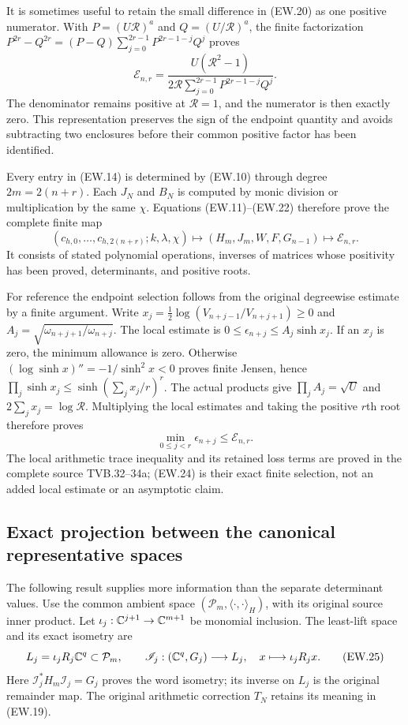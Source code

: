 It is sometimes useful to retain the small difference in (EW.20)
as one positive numerator. With
$P=(U\mathscr R)^a$ and $Q=(U/\mathscr R)^a$, the finite
factorization $P^{2r}-Q^{2r}=(P-Q)\sum_{j=0}^{2r-1}P^{2r-1-j}Q^j$
proves
\[
 \boxed{\mathcal E_{n,r}=
 \frac{U(\mathscr R^2-1)}
 {2\mathscr R\displaystyle\sum_{j=0}^{2r-1}P^{2r-1-j}Q^j}.}
                                                               \tag{EW.22}
\]
The denominator remains positive at $\mathscr R=1$, and the
numerator is then exactly zero. This representation preserves the
sign of the endpoint quantity and avoids subtracting two enclosures
before their common positive factor has been identified.

Every entry in (EW.14) is determined by (EW.10) through degree
$2m=2(n+r)$. Each $J_N$ and $B_N$ is computed by monic division
or multiplication by the same $\chi$. Equations (EW.11)--(EW.22)
therefore prove the complete finite map
\[
 \boxed{(c_{h,0},\ldots,c_{h,2(n+r)};k,\lambda,\chi)
    \longmapsto(H_m,J_m,W,F,G_{n-1})
    \longmapsto\mathcal E_{n,r}.}                            \tag{EW.23}
\]
It consists of stated polynomial operations, inverses of matrices
whose positivity has been proved, determinants, and positive roots.

For reference the endpoint selection follows from the original
degreewise estimate by a finite argument. Write
$x_j=\tfrac12\log(V_{n+j-1}/V_{n+j+1})\ge0$ and
$A_j=\sqrt{\omega_{n+j+1}/\omega_{n+j}}$.
The local estimate is $0\le\epsilon_{n+j}\le A_j\sinh x_j$.
If an $x_j$ is zero, the minimum allowance is zero. Otherwise
$(\log\sinh x)''=-1/\sinh^2x<0$ proves finite Jensen, hence
$\prod_j\sinh x_j\le\sinh(\sum_jx_j/r)^r$.
The actual products give
$\prod_jA_j=\sqrt U$ and $2\sum_jx_j=\log\mathscr R$.
Multiplying the local estimates and taking the positive $r$th root
therefore proves
\[
 \min_{0\le j<r}\epsilon_{n+j}\le\mathcal E_{n,r}.           \tag{EW.24}
\]
The local arithmetic trace inequality and its retained loss terms are
proved in the complete source TVB.32--34a; (EW.24) is their exact
finite selection, not an added local estimate or an asymptotic claim.

\subsection{Exact projection between the canonical representative spaces}

The following result supplies more information than the separate
determinant values. Use the common ambient space
$(\mathcal P_m,\langle\cdot,\cdot\rangle_H)$, with its original
source inner product. Let $\iota_j:\mathbb C^{j+1}\to\mathbb C^{m+1}$ be
monomial inclusion. The least-lift space and its exact isometry are
\[
 L_j=\iota_jR_j\mathbb C^q\subset\mathcal P_m,\qquad
 \mathscr I_j:(\mathbb C^q,G_j)\longrightarrow L_j,\quad x\longmapsto\iota_jR_jx.
                                                               \tag{EW.25}
\]
Here $\mathscr I_j^*H_m\mathscr I_j=G_j$ proves the word isometry;
its inverse on $L_j$ is the original remainder map. The original
arithmetic correction $T_N$ retains its meaning in (EW.19).

